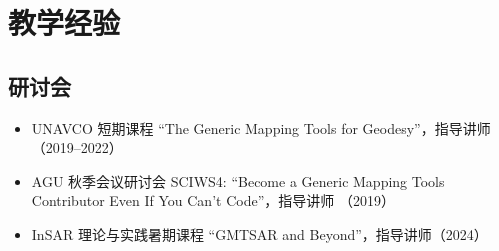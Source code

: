 \section{教学经验}

\subsection{研讨会}
\begin{itemize}
\item UNAVCO 短期课程 ``The Generic Mapping Tools for Geodesy''，指导讲师（2019--2022）
\item AGU 秋季会议研讨会 SCIWS4: ``Become a Generic Mapping Tools Contributor Even If You Can't Code''，指导讲师 （2019）
\item InSAR 理论与实践暑期课程 ``GMTSAR and Beyond''，指导讲师（2024）
\end{itemize}
